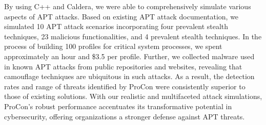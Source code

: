 By using C++ and Caldera, we were able to comprehensively simulate various aspects of APT attacks. Based on existing APT attack documentation, we simulated 10 APT attack scenarios incorporating four prevalent stealth techniques, 23 malicious functionalities, and 4 prevalent stealth techniques. In the process of building 100 profiles for critical system processes, we spent approximately an hour and \$3.5 per profile. Further, we collected malware used in known APT attacks from public repositories and websites, revealing that camouflage techniques are ubiquitous in such attacks.
As a result, the detection rates and range of threats identified by ProCon were consistently superior to those of existing solutions. With our realistic and multifaceted attack simulations, ProCon's robust performance accentuates its transformative potential in cybersecurity, offering organizations a stronger defense against APT threats.


